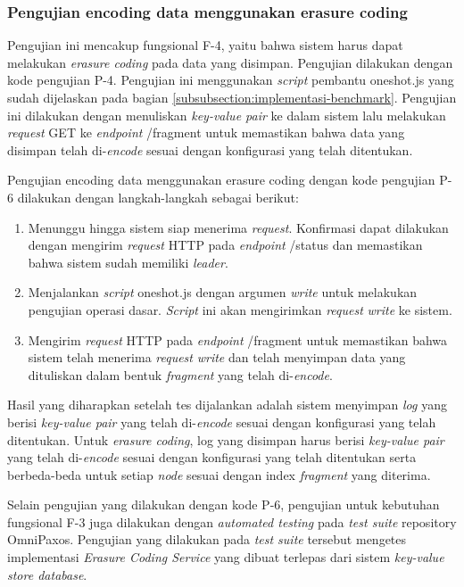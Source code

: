 \subsubsection{Pengujian encoding data menggunakan erasure coding}
\label{subsubsection:pengujian-encoding-data-erasure-coding}

Pengujian ini mencakup fungsional F-4, yaitu bahwa sistem harus dapat melakukan \textit{erasure coding} pada data yang disimpan. Pengujian dilakukan dengan kode pengujian P-4. Pengujian ini menggunakan \textit{script} pembantu oneshot.js yang sudah dijelaskan pada bagian \ref{subsubsection:implementasi-benchmark}. Pengujian ini dilakukan dengan menuliskan \textit{key-value pair} ke dalam sistem lalu melakukan \textit{request} GET ke \textit{endpoint} /fragment untuk memastikan bahwa data yang disimpan telah di-\textit{encode} sesuai dengan konfigurasi yang telah ditentukan.

Pengujian encoding data menggunakan erasure coding dengan kode pengujian P-6 dilakukan dengan langkah-langkah sebagai berikut:
\begin{enumerate}
  \item Menunggu hingga sistem siap menerima \textit{request}. Konfirmasi dapat dilakukan dengan mengirim \textit{request} HTTP pada \textit{endpoint} /status dan memastikan bahwa sistem sudah memiliki \textit{leader}.
  \item Menjalankan \textit{script} oneshot.js dengan argumen \textit{write} untuk melakukan pengujian operasi dasar. \textit{Script} ini akan mengirimkan \textit{request} \textit{write} ke sistem.
  \item Mengirim \textit{request} HTTP pada \textit{endpoint} /fragment untuk memastikan bahwa sistem telah menerima \textit{request} \textit{write} dan telah menyimpan data yang dituliskan dalam bentuk \textit{fragment} yang telah di-\textit{encode}.
\end{enumerate}

Hasil yang diharapkan setelah tes dijalankan adalah sistem menyimpan \textit{log} yang berisi \textit{key-value pair} yang telah di-\textit{encode} sesuai dengan konfigurasi yang telah ditentukan. Untuk \textit{erasure coding}, log yang disimpan harus berisi \textit{key-value pair} yang telah di-\textit{encode} sesuai dengan konfigurasi yang telah ditentukan serta berbeda-beda untuk setiap \textit{node} sesuai dengan index \textit{fragment} yang diterima.

Selain pengujian yang dilakukan dengan kode P-6, pengujian untuk kebutuhan fungsional F-3 juga dilakukan dengan \textit{automated testing} pada \textit{test suite} repository OmniPaxos. Pengujian yang dilakukan pada \textit{test suite} tersebut mengetes implementasi \textit{Erasure Coding Service} yang dibuat terlepas dari sistem \textit{key-value store database}.